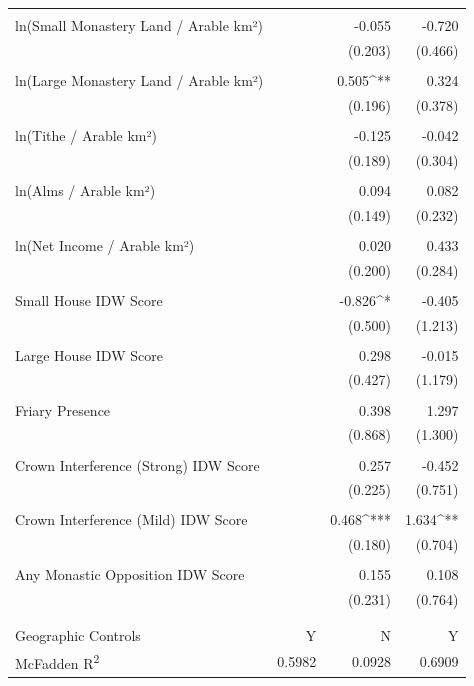 \begin{table}[H]
\begin{tabular}{@{\extracolsep{.5pt}}lD{.}{.}{-3} D{.}{.}{-3} D{.}{.}{-3} }
  & & & \\ 
 ln(Small Monastery Land / Arable km²) &  & -0.055 & -0.720 \\ 
  &  & (0.203) & (0.466) \\ 
  & & & \\ 
 ln(Large Monastery Land / Arable km²) &  & 0.505^{**} & 0.324 \\ 
  &  & (0.196) & (0.378) \\ 
  & & & \\ 
 ln(Tithe / Arable km²) &  & -0.125 & -0.042 \\ 
  &  & (0.189) & (0.304) \\ 
  & & & \\ 
 ln(Alms / Arable km²) &  & 0.094 & 0.082 \\ 
  &  & (0.149) & (0.232) \\ 
  & & & \\ 
 ln(Net Income / Arable km²) &  & 0.020 & 0.433 \\ 
  &  & (0.200) & (0.284) \\ 
  & & & \\ 
 Small House IDW Score &  & -0.826^{*} & -0.405 \\ 
  &  & (0.500) & (1.213) \\ 
  & & & \\ 
 Large House IDW Score &  & 0.298 & -0.015 \\ 
  &  & (0.427) & (1.179) \\ 
  & & & \\ 
 Friary Presence &  & 0.398 & 1.297 \\ 
  &  & (0.868) & (1.300) \\ 
  & & & \\ 
 Crown Interference (Strong) IDW Score &  & 0.257 & -0.452 \\ 
  &  & (0.225) & (0.751) \\ 
  & & & \\ 
 Crown Interference (Mild) IDW Score &  & 0.468^{***} & 1.634^{**} \\ 
  &  & (0.180) & (0.704) \\ 
  & & & \\ 
 Any Monastic Opposition IDW Score &  & 0.155 & 0.108 \\ 
  &  & (0.231) & (0.764) \\ 
  & & & \\ 
\hline \\[-1.8ex] 
Geographic Controls & Y & N & Y \\ 
McFadden R\textsuperscript{2} & 0.5982 & 0.0928 & 0.6909 \\ 

\end{tabular}
\end{table}
